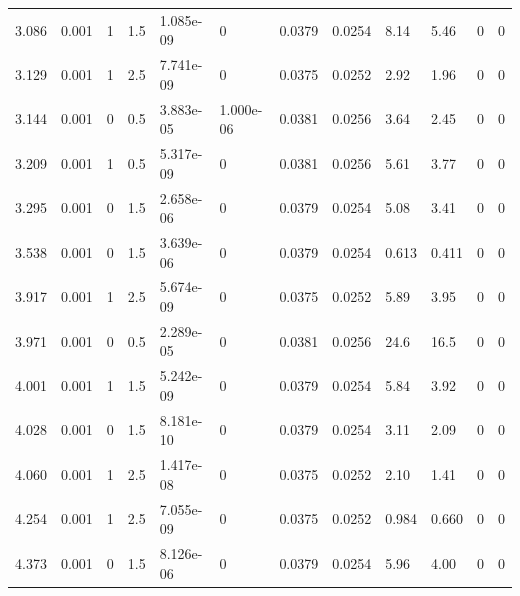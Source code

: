 \documentclass[preview]{standalone}
\begin{document}
{{\begin{tabular}{L{1.2cm}C{1.2cm} C{0.3cm}C{0.5cm} C{1.4cm}C{1.4cm} C{1.4cm}C{1.4cm} C{1.6cm}C{1.6cm} C{1.6cm}C{1.6cm}}
  3.086  &  0.001  & 1     & 1.5 &  1.085e-09  & 0  &  0.0379&   0.0254& 8.14 & 5.46   &  0 & 0  \\ 
  3.129  &  0.001  & 1     & 2.5 &  7.741e-09  & 0  &  0.0375&   0.0252& 2.92 & 1.96   &  0 & 0  \\ 
  3.144  &  0.001  & 0     & 0.5 &  3.883e-05  & 1.000e-06  &  0.0381&   0.0256& 3.64 & 2.45   &  0 & 0  \\ 
  3.209  &  0.001  & 1     & 0.5 &  5.317e-09  & 0  &  0.0381&   0.0256& 5.61 & 3.77   &  0 & 0  \\ 
  3.295  &  0.001  & 0     & 1.5 &  2.658e-06  & 0  &  0.0379&   0.0254& 5.08 & 3.41   &  0 & 0  \\ 
  3.538  &  0.001  & 0     & 1.5 &  3.639e-06  & 0  &  0.0379&   0.0254& 0.613 & 0.411   &  0 & 0  \\ 
  3.917  &  0.001  & 1     & 2.5 &  5.674e-09  & 0  &  0.0375&   0.0252& 5.89 & 3.95   &  0 & 0  \\ 
  3.971  &  0.001  & 0     & 0.5 &  2.289e-05  & 0  &  0.0381&   0.0256& 24.6 & 16.5   &  0 & 0  \\ 
  4.001  &  0.001  & 1     & 1.5 &  5.242e-09  & 0  &  0.0379&   0.0254& 5.84 & 3.92   &  0 & 0  \\ 
  4.028  &  0.001  & 0     & 1.5 &  8.181e-10  & 0  &  0.0379&   0.0254& 3.11 & 2.09   &  0 & 0  \\ 
  4.060  &  0.001  & 1     & 2.5 &  1.417e-08  & 0  &  0.0375&   0.0252& 2.10 & 1.41   &  0 & 0  \\ 
  4.254  &  0.001  & 1     & 2.5 &  7.055e-09  & 0  &  0.0375&   0.0252& 0.984 & 0.660   &  0 & 0  \\ 
  4.373  &  0.001  & 0     & 1.5 &  8.126e-06  & 0  &  0.0379&   0.0254& 5.96 & 4.00   &  0 & 0  \\ 
\hline 
\end{tabular} 

}}
\end{document}
